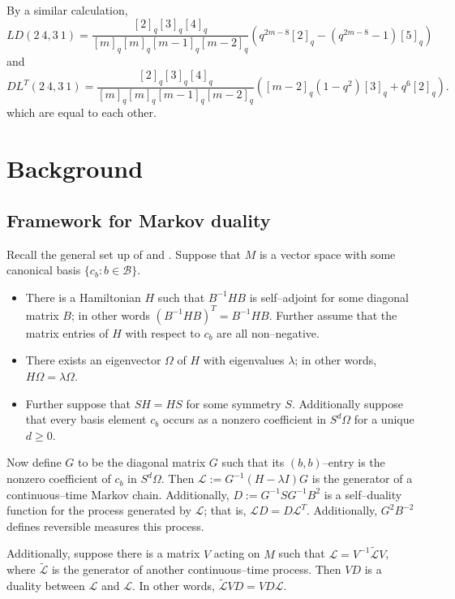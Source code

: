 \documentclass[12pt]{ximera}
\begin{document}
\begin{example}
By a similar calculation,
$$
LD( 2 \ 4, 3 \ 1) = \frac{[2]_q[3]_q[4]_q}{[m]_q[m]_q[m-1]_q[m-2]_q}( q^{2m-8}[2]_q - (q^{2m-8}-1)[5]_q)
$$
and
$$
DL^T(2 \ 4, 3 \ 1) = \frac{[2]_q[3]_q[4]_q}{[m]_q[m]_q[m-1]_q[m-2]_q}( [m-2]_q(1-q^2)[3]_q+q^6[2]_q).
$$
which are equal to each other. 
\end{example}
\section{Background}

\subsection{Framework for Markov duality}\label{SETUP}
Recall the general set up of \cite{CGRS} and \cite{KIMRN}. Suppose that $M$ is a vector space with some canonical basis $\{c_b: b\in \mathcal{B}\}$.
\begin{itemize}
\item
There is a Hamiltonian $H$  such that $B^{-1}HB$ is self--adjoint for some diagonal matrix $B$; in other words $(B^{-1}HB)^T=B^{-1}HB.$ Further assume that the matrix entries of $H$ with respect to $c_b$ are all non--negative. 

\item
There exists an eigenvector $\Omega$  of $H$ with eigenvalues $\lambda$; in other words, $H\Omega = \lambda \Omega$. 

\item

Further suppose that $SH=HS$ for some symmetry $S$. Additionally suppose that every basis element $c_b$ occurs as a nonzero coefficient in $S^d\Omega$ for a unique $d\geq 0$. 


\end{itemize}

Now define $G$ to be the diagonal matrix $G$ such that its $(b,b)$--entry is the nonzero coefficient of $c_b$ in $S^d\Omega$. Then $\mathcal{L}:=G^{-1}(H-\lambda {I})G$ is the generator of a continuous--time Markov chain. Additionally, $D:=G^{-1}SG^{-1}B^2$ is a self--duality function for the process generated by $\mathcal{L}$; that is, $\mathcal{L}D=D\mathcal{L}^T$. Additionally, $G^2B^{-2}$ defines reversible measures this process.

Additionally, suppose there is a matrix $V$ acting on $M$ such that $\mathcal{L}=V^{-1} \tilde{\mathcal{L}}V$, where $\tilde{\mathcal{L}}$ is the generator of another continuous--time process. Then $VD$ is a duality between $\mathcal{L}$ and $\mathcal{L}$. In other words, $\tilde{\mathcal{L}}VD=VD\mathcal{L}$.
\end{document}
